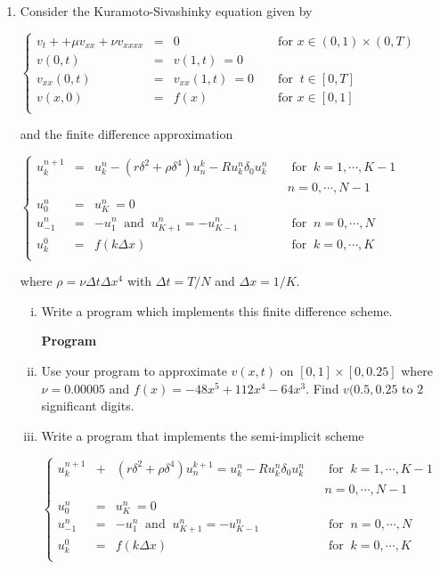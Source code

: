 \documentclass[12pt]{article}
\theoremstyle{definition}
\begin{document}
\begin{enumerate}
\item Consider the Kuramoto-Sivashinky equation given by
\begin{center}$\left \{\begin{array}{ccccccc}
v_t++\mu v_{xx}+ \nu v_{xxxx}&=&0 && \text{ for }  x\in(0,1)\times (0,T)\\
v(0,t)&=&v(1,t)\ =0\\
v_{xx}(0,t)&=&v_{xx}(1,t)\ =0 && \text{ for } \ t\in [0,T]\\
v(x,0)&=&f(x) && \text{ for } x\in[0,1]\\
\end{array}\right.$\end{center}
and the finite difference approximation
\begin{center}$\left \{\begin{array}{ccccccc}
u_k^{n+1}&=&u_k^n-(r\delta^2 +\rho\delta^4)u_n^k -Ru_k^n\delta_0u_k^n && \text{ for } \ k=1,\cdots,K-1\\
&&&& n=0,\cdots,N-1\\
u_0^n&=&u_K^n\ =0\\
u_{-1}^n&=& -u_1^n \ \text{ and }\  u_{K+1}^n=-u_{K-1}^n& & \text{ for } \ n=0,\cdots,N\\
u_k^0&=&f(k\Delta x) && \text{ for }\ k=0,\cdots,K\\
\end{array}\right.$\end{center}
where $\rho=\nu\Delta t\Delta x^4$ with $\Delta t=T/N$ and $\Delta x=1/K$.

\begin{enumerate}[(i)]

\item Write a program which implements this finite difference scheme.

\textbf{Program}


\item Use your program to approximate $v(x,t)$ on $[0,1]\times[0,0.25]$ where $\nu=0.00005$ and $f(x)=-48x^5+112x^4-64x^3$. Find $v(0.5,0.25$ to $2$ significant digits.

\item Write a program that implements the semi-implicit scheme
\begin{center}$\left \{\begin{array}{ccccccc}
u_k^{n+1}&+&(r\delta^2 +\rho\delta^4)u_n^{k+1}=u_k^n -Ru_k^n\delta_0u_k^n && \text{ for } \ k=1,\cdots,K-1\\
&&&& n=0,\cdots,N-1\\
u_0^n&=&u_K^n\ =0\\
u_{-1}^n&=& -u_1^n \ \text{ and } \ u_{K+1}^n=-u_{K-1}^n && \text{ for } \ n=0,\cdots,N\\
u_k^0&=&f(k\Delta x) && \text{ for }\ k=0,\cdots,K\\
\end{array}\right.$\end{center}


\end{enumerate}
\end{enumerate}
\end{document}
